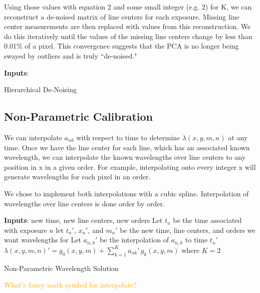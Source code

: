 \documentclass[12pt, letterpaper]{article}
\newcommand{\lz}[1]{\textcolor{orange}{#1}}
\begin{document}
Using those values with equation 2 and some small integer (e.g. 2) for K, we can reconstruct a de-noised matrix of line centers for each exposure.  Missing line center measurements are then replaced with values from this reconstruction.  We do this iteratively until the values of the missing line centers change by less than 0.01\% of a pixel.  This convergence suggests that the PCA is no longer being swayed by outliers and is truly ``de-noised."

\begin{algorithm}
\SetAlgoLined
\textbf{Inputs}: \;
\caption{Hierarchical De-Noising}
\end{algorithm}

\subsection{Non-Parametric Calibration} \label{sec:nonparam}
We can interpolate $a_{nk}$ with respect to time to determine $\lambda(x,y,m,n)$ at any time.  Once we have the line center for each line, which has an associated known wavelength, we can interpolate the known wavelengths over line centers to any position in x in a given order.  For example, interpolating onto every integer x will generate wavelengths for each pixel in an order.

We chose to implement both interpolations with a cubic spline.  Interpolation of wavelengths over line centers is done order by order.

\begin{algorithm}
\SetAlgoLined
\textbf{Inputs}: new time, new line centers, new orders\; %
Let $t_n$ be the time associated with exposure $n$\;
let $t_n'$, $x_n'$, and $m_n'$ be the new time, line centers, and orders we want wavelengths for\;
Let $a_{n,k}'$ be the interpolation of $a_{n,k}$ to time $t_n'$\;
$\lambda(x,y,m,n)' = g_0(x,y,m) + \sum_{k=1}^K a_{nk}'\,g_k(x,y,m)$ where $K=2$\;
\caption{Non-Parametric Wavelength Solution}
\end{algorithm}
\lz{What's fancy math symbol for interpolate?}
\end{document}
